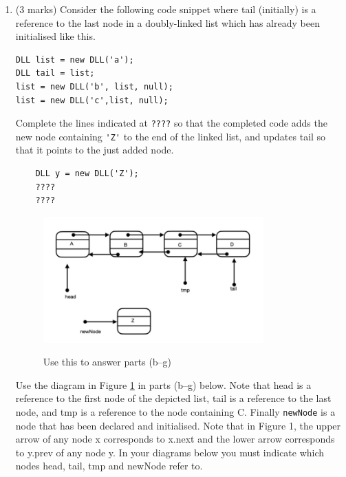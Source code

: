 \documentclass[twoside=false,DIV=14]{scrartcl}
\begin{document}
\begin{enumerate}
\item (3 marks) Consider the following code snippet where tail (initially) is a reference to the last node in a doubly-linked list which has already been initialised like this.
\begin{lstlisting}
DLL list = new DLL('a');
DLL tail = list;
list = new DLL('b', list, null);
list = new DLL('c',list, null);
\end{lstlisting}
Complete the lines indicated at \verb+????+ so that the completed code adds the new node containing \verb+'Z'+ to the end of the linked list, and updates tail so that it points to the just added node.
\begin{lstlisting}
    DLL y = new DLL('Z');
    ????
    ???? 
\end{lstlisting} 

\begin{figure}
\includegraphics[width=0.8\textwidth]{./2022_q1.jpg}
\label{fig:dll}
\caption{Use this to answer parts (b–g)}
\end{figure}
Use the diagram in Figure \ref{fig:dll} in parts (b–g) below. Note that head is a reference to the first node of the depicted list, tail is a reference to the last node, and tmp is a reference to the node containing C. Finally \verb+newNode+ is a node that has been declared and initialised. Note that in Figure 1, the upper arrow of any node x corresponds to x.next and the lower arrow corresponds to y.prev of any node y. In your diagrams below you must indicate which nodes head, tail, tmp and newNode refer to.


\end{enumerate}
\end{document}
